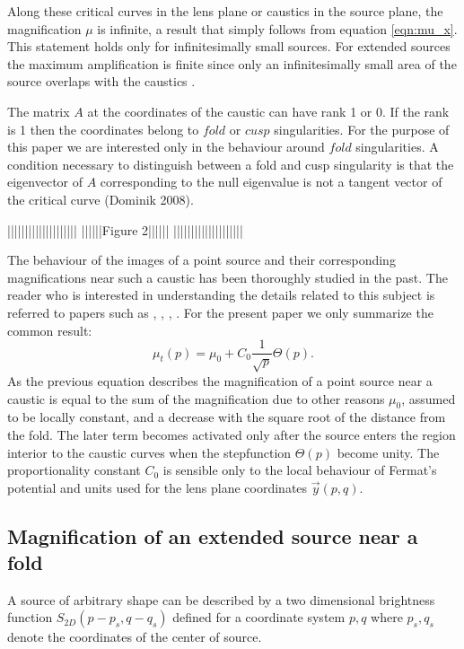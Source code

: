 Along these critical curves in the lens plane or caustics in the source plane,  the magnification $\mu$ is infinite, a result that simply follows from equation \ref{eqn:mu_x}. This statement holds only for infinitesimally small sources. For extended sources the maximum amplification is finite since only an infinitesimally small area of the source
overlaps with the caustics \citep{1986BAAS...18T.907S,}. 

The matrix $A$ at the coordinates of the caustic can have rank 1 or 0. If the rank is 1 then the coordinates belong to $fold$ or $cusp$ singularities. For the purpose 
of this paper we are interested only in the behaviour around $fold$ singularities. A condition necessary to distinguish between a fold and cusp singularity is that the
eigenvector of $A$ corresponding to the null eigenvalue is not a tangent vector of the critical curve \citep{1992A&A...260....1S,}(Dominik 2008).

||||||||||||||||||||
||||||Figure 2||||||
||||||||||||||||||||


The behaviour of the images of a point source and their corresponding magnifications near such a caustic has been thoroughly studied in the past. The reader who is interested in 
understanding the details related to this subject is referred to papers such as \cite{1986ApJ...310..568B}, \cite{1992A&A...260....1S,}, \cite{2002ApJ...574..970G}, \cite{2002ApJ...580..468G}. For the present paper we only 
summarize the common result:
\begin {equation}
 \mu_{t}(p) = \mu_0 + C_0 \frac{1}{\sqrt{p}} \Theta(p).
\end {equation}
As the previous equation describes the magnification of a point source near a caustic is equal to the sum of the magnification due to other reasons $\mu_0$, assumed to be locally constant,  and a decrease with
the square root of the distance from the fold. The later term becomes activated only after the source enters the region interior to the caustic curves when the stepfunction $\Theta(p)$ become unity. The proportionality
constant $C_0$  is sensible only to the local behaviour of Fermat's potential and units used for the lens plane coordinates $\vec{y}(p,q)$. 

\subsection{Magnification of an extended source near a fold}

A source of arbitrary shape can be described by a two dimensional brightness function $S_{2D}(p - p_s, q - q_s)$ defined for a coordinate system $p,q$ where $p_s, q_s$ denote the coordinates of the center of source.

